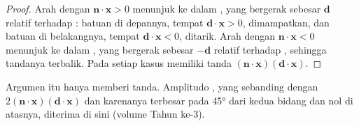\begin{proof}
Arah dengan $\mathbf n\cdot\mathbf x > 0$ menunjuk ke dalam , yang bergerak sebesar $\mathbf d$ relatif terhadap : batuan di depannya, tempat $\mathbf d\cdot\mathbf x > 0$, dimampatkan, dan batuan di belakangnya, tempat $\mathbf d\cdot\mathbf x < 0$, ditarik. Arah dengan $\mathbf n\cdot\mathbf x < 0$ menunjuk ke dalam , yang bergerak sebesar $-\mathbf d$ relatif terhadap , sehingga tandanya terbalik. Pada setiap kasus  memiliki tanda $(\mathbf n\cdot\mathbf x)(\mathbf
d\cdot\mathbf x)$.
\end{proof}

Argumen itu hanya memberi tanda. Amplitudo , yang sebanding dengan $2(\mathbf n\cdot\mathbf x)(\mathbf d\cdot\mathbf x)$ dan karenanya terbesar pada \ang{45} dari kedua bidang dan nol di atasnya, diterima di sini (volume Tahun ke-3).

